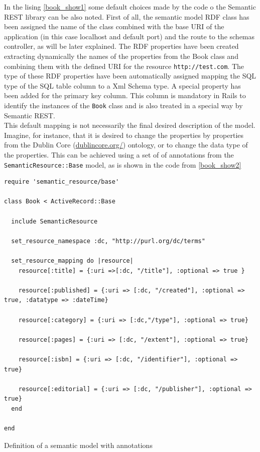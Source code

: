 In the lising \ref{book_show1} some default choices made by the code o the Semantic REST
library can be also noted. First of all, the semantic model RDF class has been assigned the name of the class combined with the base URI of the
application (in this case localhost and default port) and the route to the schemas controller, as will be later
explained. The RDF properties have been created extracting dynamically the names of the properties from the Book class and
combining them with the defined URI for the resource \texttt{http://test.com}. The type of these RDF properties have
been automatically assigned mapping the SQL type of the SQL table column to a Xml Schema type. A special property has been
added for the primary key column. This column is mandatory in Rails to identify the instances of the \texttt{Book} class
and is also treated in a special way by Semantic REST. \\
This default mapping is not necessarily the final desired description of the model. Imagine, for instance,
that it is desired to change the properties by properties from the Dublin Core (\url{dublincore.org/}) ontology, or to change the data type of the properties. This can be achieved using a set of of annotations from  the
\texttt{SemanticResource::Base} model, as is shown in the code from \ref{book_show2}

\begin{table}
\vspace{5 mm}
\begin{lstlisting}
require 'semantic_resource/base'

class Book < ActiveRecord::Base

  include SemanticResource

  set_resource_namespace :dc, "http://purl.org/dc/terms"

  set_resource_mapping do |resource|
    resource[:title] = {:uri =>[:dc, "/title"], :optional => true }

    resource[:published] = {:uri => [:dc, "/created"], :optional => true, :datatype => :dateTime}

    resource[:category] = {:uri => [:dc,"/type"], :optional => true}

    resource[:pages] = {:uri => [:dc, "/extent"], :optional => true}

    resource[:isbn] = {:uri => [:dc, "/identifier"], :optional => true}

    resource[:editorial] = {:uri => [:dc, "/publisher"], :optional => true}
  end

end
\end{lstlisting} 
\vspace{5 mm}
\caption{Definition of a semantic model with annotations}
\label{book_show2}
\end{table}

